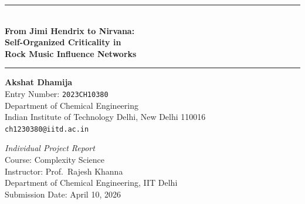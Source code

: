 \documentclass[12pt, a4paper]{article}
\begin{document}
\begin{titlepage}
\begin{center}
  \vspace*{1.2cm}
  {\color{rockblue}\rule{\linewidth}{2pt}}\\[0.5cm]
  {\Huge\bfseries\color{rockblue}
    From Jimi Hendrix to Nirvana:\\[8pt]
    Self-Organized Criticality in\\[8pt]
    Rock Music Influence Networks}\\[0.5cm]
  {\color{rockblue}\rule{\linewidth}{2pt}}

  \vspace{1.2cm}
  {\LARGE\bfseries Akshat Dhamija}\\[0.5cm]
  {\large Entry Number: \texttt{2023CH10380}}\\[0.3cm]
  {\large Department of Chemical Engineering}\\[0.2cm]
  {\large Indian Institute of Technology Delhi, New Delhi 110016}\\[0.2cm]
  {\large \texttt{ch1230380@iitd.ac.in}}

  \vspace{1.2cm}
  \begin{tcolorbox}[colback=rockblue!5, colframe=rockblue,
      width=0.85\linewidth, arc=4pt, boxrule=1.2pt]
  \centering
  {\large\itshape Individual Project Report}\\[0.3cm]
  {\normalsize
    Course: Complexity Science\\[0.15cm]
    Instructor: Prof.\ Rajesh Khanna\\[0.15cm]
    Department of Chemical Engineering, IIT Delhi\\[0.15cm]
    Submission Date: April 10, 2026}
  \end{tcolorbox}


\end{center}
\end{titlepage}
\end{document}
